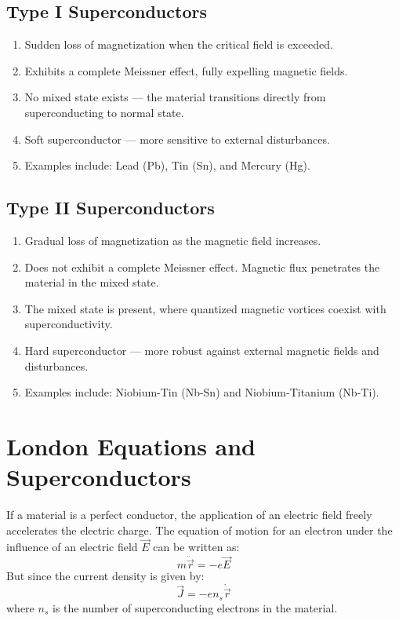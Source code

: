 \documentclass{article}
\begin{document}
\subsection{Type I Superconductors}
\begin{enumerate}
    \item Sudden loss of magnetization when the critical field is exceeded.
    \item Exhibits a complete Meissner effect, fully expelling magnetic fields.
    \item No mixed state exists — the material transitions directly from superconducting to normal state.
    \item Soft superconductor — more sensitive to external disturbances.
    \item Examples include: Lead (Pb), Tin (Sn), and Mercury (Hg).
\end{enumerate}

\subsection{Type II Superconductors}
\begin{enumerate}
    \item Gradual loss of magnetization as the magnetic field increases.
    \item Does not exhibit a complete Meissner effect. Magnetic flux penetrates the material in the mixed state.
    \item The mixed state is present, where quantized magnetic vortices coexist with superconductivity.
    \item Hard superconductor — more robust against external magnetic fields and disturbances.
    \item Examples include: Niobium-Tin (Nb-Sn) and Niobium-Titanium (Nb-Ti).
\end{enumerate}

\section{London Equations and Superconductors}

If a material is a perfect conductor, the application of an electric field freely accelerates the electric charge. The equation of motion for an electron under the influence of an electric field \(\vec{E}\) can be written as:
\[
m \ddot{\vec{r}} = -e \vec{E} \tag{1}
\]
But since the current density is given by:
\[
\vec{J} = -en_s \dot{\vec{r}} \tag{2a}
\]
where \(n_s\) is the number of superconducting electrons in the material.
\end{document}
